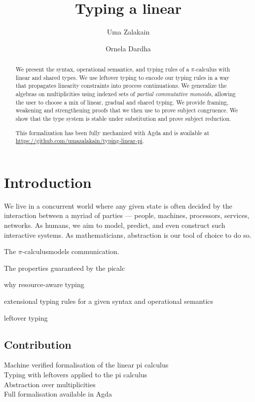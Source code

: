 \documentclass[a4paper,UKenglish,cleveref, autoref, thm-restate,authorcolumns]{lipics-v2019}
\title{Typing a linear \picalc}
\author{Uma Zalakain}{University of Glasgow, Scotland}
       {u.zalakain.1@research.gla.ac.uk}{https://orcid.org/0000-0002-3268-9338}{}
\author{Ornela Dardha}{University of Glasgow, Scotland}
       {ornela.dardha@glasgow.ac.uk}{https://orcid.org/0000-0001-9927-7875}{}
\theoremstyle{definition}
\newcommand{\picalc}{$\pi$-calculus}
\begin{document}
\maketitle
{}

\begin{abstract}
  We present the syntax, operational semantics, and typing rules of a \picalc{} with linear and shared types.
  We use leftover typing \cite{Allais2018a} to encode our typing rules in a way that propagates linearity constraints into process continuations.
  We generalize the algebras on multiplicities using indexed sets of \emph{partial commutative monoids}, allowing the user to choose a mix of linear, gradual and shared typing.
  We provide framing, weakening and strengthening proofs that we then use to prove subject congruence.
  We show that the type system is stable under substitution and prove subject reduction.

  This formalization has been fully mechanized with Agda and is available at \url{https://github.com/umazalakain/typing-linear-pi}.
\end{abstract}

\section{Introduction}

We live in a concurrent world where any given state is often decided by the interaction between a myriad of parties --- people, machines, processors, services, networks.
As humans, we aim to model, predict, and even construct such interactive systems.
As mathematicians, abstraction is our tool of choice to do so.

The \picalc models communication.

The properties guaranteed by the picalc

why resource-aware typing

extensional typing rules for a given syntax and operational semantics

leftover typing

\subsection{Contribution}

\begin{description}
  \item [Machine verified formalisation of the linear pi calculus]

  \item [Typing with leftovers applied to the pi calculus]

  \item [Abstraction over multiplicities]

  \item [Full formalisation available in Agda]
\end{description}
\end{document}
